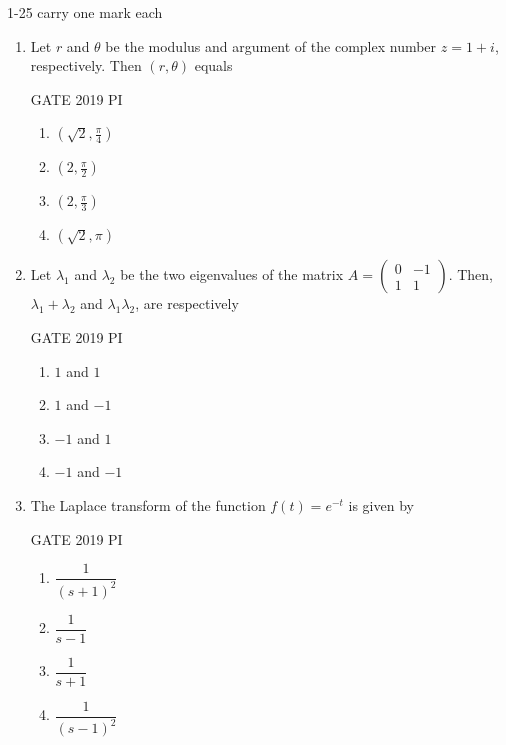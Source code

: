 \documentclass[journal,12pt,onecolumn]{IEEEtran}
\theoremstyle{remark}
\begin{document}
1-25 carry one mark each
\begin{enumerate}
 \item Let $r$ and $\theta$ be the modulus and argument of the complex number $z = 1 + i$, respectively. Then $(r, \theta)$ equals

\hfill{GATE 2019 PI}

\begin{multicols}{2}
\begin{enumerate}
    \item $(\sqrt{2}, \frac{\pi}{4})$
    \item $(2, \frac{\pi}{2})$
    \item $(2, \frac{\pi}{3})$
    \item $(\sqrt{2}, \pi)$
\end{enumerate}
\end{multicols}

\item Let $\lambda_1$ and $\lambda_2$ be the two eigenvalues of the matrix $A = \begin{pmatrix} 0 & -1 \\ 1 & 1 \end{pmatrix}$. Then, $\lambda_1 + \lambda_2$ and $\lambda_1 \lambda_2$, are respectively

\hfill{GATE 2019 PI}

\begin{multicols}{2}
\begin{enumerate}
    \item $1$ and $1$
    \item $1$ and $-1$
    \item $-1$ and $1$
    \item $-1$ and $-1$
\end{enumerate}
\end{multicols}

\item The Laplace transform of the function $f(t) = e^{-t}$ is given by

\hfill{GATE 2019 PI}

\begin{multicols}{2}
\begin{enumerate}
    \item $\dfrac{1}{(s+1)^2}$
    \item $\dfrac{1}{s-1}$
    \item $\dfrac{1}{s+1}$
    \item $\dfrac{1}{(s-1)^2}$
\end{enumerate}
\end{multicols}


\end{enumerate}
\end{document}
